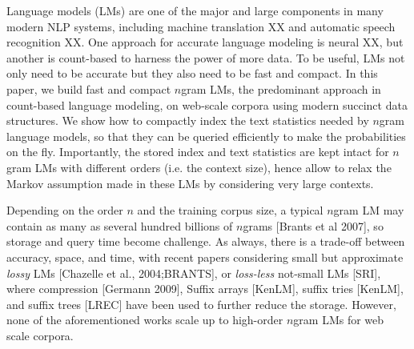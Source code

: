 Language models (LMs) are one of the major and large components in many modern NLP systems, including machine translation XX and automatic speech recognition XX.
%
One approach for accurate language modeling is neural XX, but another is  count-based to harness the power of more data.
%
%
To be useful, LMs not only need to be accurate but they also need to be fast and compact.
%
In this paper, we build  fast and compact $n$gram LMs, the predominant approach in count-based language modeling, on web-scale corpora using modern succinct data structures.
%
We show how to compactly index the text statistics needed by $n$gram language models, so that they can be queried efficiently to make the probabilities on the fly.       
%
Importantly, the stored index and text statistics are kept intact for $n$gram LMs with different orders (i.e. the context size), hence allow to relax the
Markov assumption made in these LMs by considering very large contexts.



Depending on the order $n$ and the training corpus size, a typical $n$gram LM may contain as many as several hundred billions of $n$grams [Brants et al 2007],
so storage and query time become challenge.
%
As always, there is a trade-off between accuracy, space, and time, with recent papers considering small but approximate  \emph{lossy} LMs [Chazelle et al., 2004;BRANTS],
or \emph{loss-less}  not-small LMs [SRI], where compression [Germann 2009], Suffix arrays [KenLM], suffix tries [KenLM], and suffix trees [LREC]  have been used to further reduce the storage.
% 
However, none of the aforementioned works scale up to high-order  $n$gram LMs for web scale corpora. 

